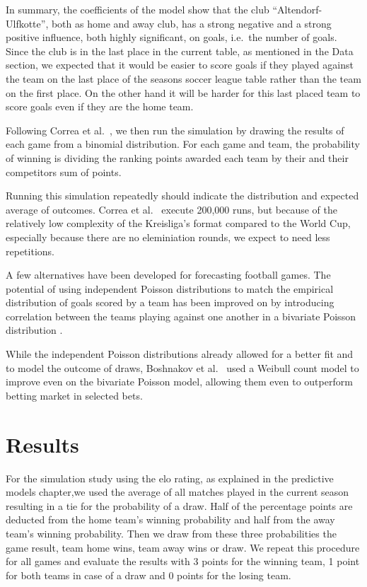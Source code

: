 \documentclass[12pt,a4paper]{article}
\begin{document}
In summary, the coefficients of the model show that the club
\enquote{Altendorf-Ulfkotte}, both as home and away club, has a strong
negative and a strong positive influence, both highly significant, on
goals, i.e.~the number of goals. Since the club is in the last place in
the current table, as mentioned in the Data section, we expected that it
would be easier to score goals if they played against the team on the
last place of the seasons soccer league table rather than the team on
the first place. On the other hand it will be harder for this last
placed team to score goals even if they are the home team.

Following Correa et al.~\autocite*{correa}, we then run the simulation
by drawing the results of each game from a binomial distribution. For
each game and team, the probability of winning is dividing the ranking
points awarded each team by their and their competitors sum of points.

Running this simulation repeatedly should indicate the distribution and
expected average of outcomes. Correa et al.~\autocite*{correa} execute
200,000 runs, but because of the relatively low complexity of the
Kreisliga's format compared to the World Cup, especially because there
are no eleminiation rounds, we expect to need less repetitions.

A few alternatives have been developed for forecasting football games.
The potential of using independent Poisson distributions to match the
empirical distribution of goals scored by a team has been improved on by
introducing correlation between the teams playing against one another in
a bivariate Poisson distribution \textcite{karlis2003}.

While the independent Poisson distributions already allowed for a better
fit and to model the outcome of draws, Boshnakov et
al.~\autocite*{boshnakov2016} used a Weibull count model to improve even
on the bivariate Poisson model, allowing them even to outperform betting
market in selected bets.

\hypertarget{results}{%
\section{Results}\label{results}}

For the simulation study using the elo rating, as explained in the
predictive models chapter,we used the average of all matches played in
the current season resulting in a tie for the probability of a draw.
Half of the percentage points are deducted from the home team's winning
probability and half from the away team's winning probability. Then we
draw from these three probabilities the game result, team home wins,
team away wins or draw. We repeat this procedure for all games and
evaluate the results with 3 points for the winning team, 1 point for
both teams in case of a draw and 0 points for the losing team.
\end{document}
